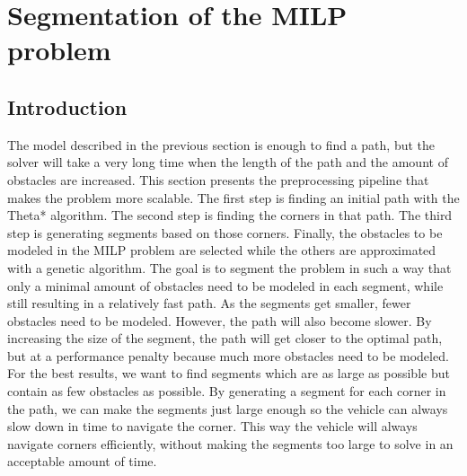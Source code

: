 \section{Segmentation of the MILP problem}
\label{section:segment}
\subsection{Introduction}
The model described in the previous section is enough to find a path, but the solver will take a very long time when the length of the path and the amount of obstacles are increased. This section presents the preprocessing pipeline that makes the problem more scalable. The first step is finding an initial path with the Theta* algorithm. The second step is finding the corners in that path. The third step is generating segments based on those corners. Finally, the obstacles to be modeled in the MILP problem are selected while the others are approximated with a genetic algorithm. The goal is to segment the problem in such a way that only a minimal amount of obstacles need to be modeled in each segment, while still resulting in a relatively fast path. As the segments get smaller, fewer obstacles need to be modeled. However, the path will also become slower. By increasing the size of the segment, the path will get closer to the optimal path, but at a performance penalty because much more obstacles need to be modeled.\\
For the best results, we want to find segments which are as large as possible but contain as few obstacles as possible. By generating a segment for each corner in the path, we can make the segments just large enough so the vehicle can always slow down in time to navigate the corner. This way the vehicle will always navigate corners  efficiently, without making the segments too large to solve in an acceptable amount of time.
